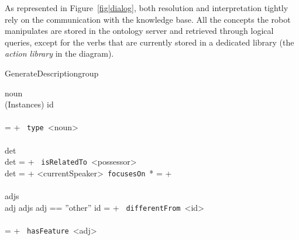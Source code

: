 As represented in Figure~\ref{fig|dialog}, both resolution and interpretation
tightly rely on the communication with the knowledge base. All the concepts the
robot manipulates are stored in the ontology server and retrieved through
logical queries, except for the verbs that are currently stored in a dedicated
library (the \emph{action library} in the diagram).

\small
\begin{pseudocode}[ruled]{GenerateDescription}{group}
\label{algo|generatedescription}

   noun \GETS {} \\ 
   \IF {} \in (Instances) %
   		\BEGIN
		id \GETS {}\\	
		\\
		\END
   \ELSE
    	 =  + \langle *\ {\tt type}\ <noun>\rangle \\
   
   \\
   det \GETS {} \\
   \IF det  \THEN
        =  + \langle *\ {\tt isRelatedTo}\ <possessor>\rangle \\
    
    \IF det  \THEN
        \BEGIN
        \IF {} \THEN 
             =  + \langle<currentSpeaker>\ {\tt focusesOn}\ *\rangle
        \ELSE
             =  +  %
        \END \\
   \\
   adjs \GETS {} \\
   \FOREACH adj \in adjs \DO
   	\BEGIN
   		\IF adj == ''other'' \THEN 
   			\BEGIN
   			id \GETS {} %
   			 =  + \langle *\ {\tt differentFrom}\ <id> \rangle\\
   			\\
			\END   		
   		\ELSE
	     	 =  + \langle *\ {\tt hasFeature}\ <adj>\rangle %
    \END\\
    

\end{pseudocode}
